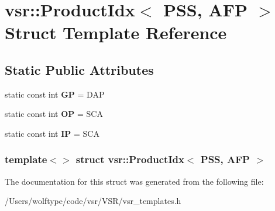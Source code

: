 \hypertarget{structvsr_1_1_product_idx_3_01_p_s_s_00_01_a_f_p_01_4}{\section{vsr\-:\-:Product\-Idx$<$ P\-S\-S, A\-F\-P $>$ Struct Template Reference}
\label{structvsr_1_1_product_idx_3_01_p_s_s_00_01_a_f_p_01_4}
}
\subsection*{Static Public Attributes}
\begin{DoxyCompactItemize}
\item 
\hypertarget{structvsr_1_1_product_idx_3_01_p_s_s_00_01_a_f_p_01_4_a3fd6b45ccd716965e21547bc08c3547b}{static const int {\bfseries G\-P} = D\-A\-P}\label{structvsr_1_1_product_idx_3_01_p_s_s_00_01_a_f_p_01_4_a3fd6b45ccd716965e21547bc08c3547b}

\item 
\hypertarget{structvsr_1_1_product_idx_3_01_p_s_s_00_01_a_f_p_01_4_acf7cc4598433c71ba6ea124aa0eb4796}{static const int {\bfseries O\-P} = S\-C\-A}\label{structvsr_1_1_product_idx_3_01_p_s_s_00_01_a_f_p_01_4_acf7cc4598433c71ba6ea124aa0eb4796}

\item 
\hypertarget{structvsr_1_1_product_idx_3_01_p_s_s_00_01_a_f_p_01_4_aaaa17851e4b425d60b50ca3b00f0ead5}{static const int {\bfseries I\-P} = S\-C\-A}\label{structvsr_1_1_product_idx_3_01_p_s_s_00_01_a_f_p_01_4_aaaa17851e4b425d60b50ca3b00f0ead5}

\end{DoxyCompactItemize}
\subsubsection*{template$<$$>$ struct vsr\-::\-Product\-Idx$<$ P\-S\-S, A\-F\-P $>$}



The documentation for this struct was generated from the following file\-:\begin{DoxyCompactItemize}
\item 
/\-Users/wolftype/code/vsr/\-V\-S\-R/vsr\-\_\-templates.\-h\end{DoxyCompactItemize}
